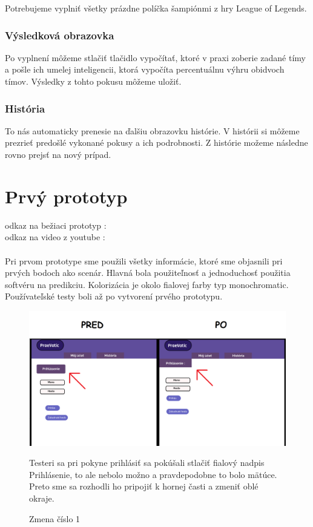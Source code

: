 Potrebujeme vyplniť všetky prázdne políčka šampiónmi z hry League of Legends.

\subsubsection{Výsledková obrazovka}

Po vyplnení môžeme stlačiť tlačidlo vypočítať, ktoré v praxi zoberie zadané tímy a pošle ich umelej inteligencii, ktorá vypočíta percentuálnu výhru obidvoch tímov. Výsledky z tohto pokusu môžeme uložiť.

\subsubsection{História}

To nás automaticky prenesie na ďalšiu obrazovku histórie. V histórii si môžeme prezrieť predošlé vykonané pokusy a ich podrobnosti. Z histórie možeme následne rovno prejsť na nový prípad.





\section*{Prvý prototyp}

odkaz na bežiaci prototyp :
\cite{figma}
\\
odkaz na video z youtube :
\cite{youtube}
	\\ \\
Pri prvom prototype sme použili všetky informácie, ktoré sme objasnili pri prvých bodoch ako scenár. Hlavná bola použiteľnosť a jednoduchosť použitia softvéru na predikciu. Kolorizácia je okolo fialovej farby typ monochromatic. Používateľské testy boli až po vytvorení prvého prototypu. 


\begin{figure}[h!]
	
	\includegraphics[width=.9\textwidth]{figures/predtym}
	
	\centering
	
	\caption{ Zmena číslo 1\label{predtym}}

	Testeri sa pri pokyne prihlásiť sa pokúšali stlačiť fialový nadpis Prihlásenie, to ale nebolo možno a pravdepodobne to bolo mätúce. Preto sme sa rozhodli ho pripojiť k hornej časti a zmeniť oblé okraje.
	
\end{figure}





